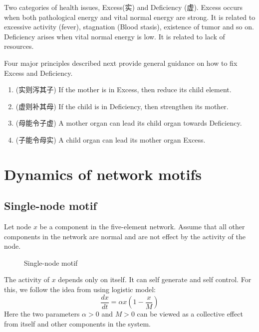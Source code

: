 \documentclass{article}
\begin{document}
Two categories of health issues, Excess(实) and  Deficiency (虚). Excess occurs when both pathological energy and   vital normal energy are  strong. It is related to excessive activity (fever), stagnation (Blood stasis), existence of tumor and so on. 
Deficiency arises when vital normal energy is low. It is related to lack of resources. 

Four major principles described next provide general guidance on how to fix Excess and Deficiency.  

\begin{enumerate}
    \item (实则泻其子) If the mother is in  Excess, then reduce  its child element. 
    \item (虚则补其母) If the child is in Deficiency, then strengthen its mother.
    \item (母能令子虚) A mother organ can lead  its child organ towards Deficiency. \cite{nanJing} 
    \item (子能令母实) A child organ can lead its mother organ Excess. 
\cite{nanJing}
    
\end{enumerate}


\section{Dynamics of network motifs}


\subsection{Single-node motif}
Let node $x$ be a component in the five-element network. 
Assume that all other components in the network are normal and are not effect by the activity of the node. 
\begin{figure}[!htb]
\centering
{}
 \label{F:single_node}
 \caption{Single-node motif}
\end{figure}
The activity of $x$ depends only on itself. It can self generate and self control. For this, we follow the idea from \cite{Nian2025} using logistic model:
\[
\frac{dx}{dt} = \alpha x(1-\frac{x}{M})
\]
Here the two parameters $\alpha>0$ and $M>0$ can be viewed as a collective effect from itself and other components in the system.
\end{document}
